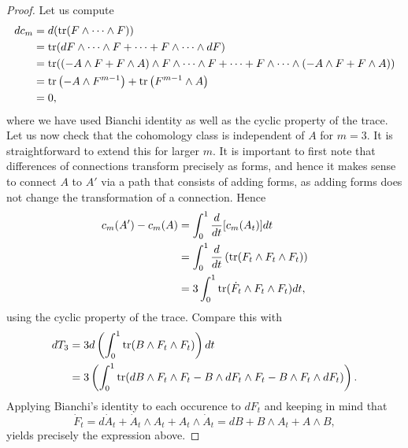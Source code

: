 \documentclass{../mathnotes}
\begin{document}
\begin{proof}
    Let us compute
    \begin{align*}
        dc_m&=d(\operatorname{tr}(F\wedge\cdots\wedge F))\\
        &=\operatorname{tr}(dF\wedge\cdots\wedge F+\cdots+F\wedge\cdots\wedge dF)\\
        &=\operatorname{tr}( (-A\wedge F+F\wedge A)\wedge F\wedge\cdots\wedge F+\cdots+F\wedge\cdots\wedge(-A\wedge F+F\wedge A))\\
        &=\operatorname{tr}\left( -A\wedge F^{m-1} \right)+\operatorname{tr}\left( F^{m-1}\wedge A \right)\\
        &=0,
    \end{align*}
    where we have used Bianchi identity as well as the cyclic property of the trace. Let us now check that the cohomology
    class is independent of $A$ for $m=3$. It is straightforward to extend this for larger $m$. It is important
    to first note that differences of connections transform precisely as forms, and hence it makes sense to
    connect $A$ to $A'$ via a path that consists of adding forms, as adding forms does not change the transformation of a connection.
    Hence
    \begin{align*}
        c_m(A')-c_m(A)&=\int_0^1\frac{d}{dt}[c_m(A_t)]dt\\
        &=\int_0^1\frac{d}{dt}\left( \operatorname{tr}(F_t\wedge F_t\wedge F_t) \right)\\
        &=3\int_0^1\operatorname{tr}(\dot F_t\wedge F_t\wedge F_t) dt,
    \end{align*}
    using the cyclic property of the trace. Compare this with
    \begin{align*}
        dT_3&=3d\left( \int_0^1\operatorname{tr}(B\wedge F_t\wedge F_t) \right)dt\\
        &=3\left( \int_0^1\operatorname{tr}(dB\wedge F_t\wedge F_t-B\wedge dF_t\wedge F_t-B\wedge F_t\wedge dF_t) \right).
    \end{align*}
    Applying Bianchi's identity to each occurence to $dF_t$ and keeping in mind that
    \[\dot F_t=d\dot A_t+\dot A_t\wedge A_t+A_t\wedge \dot A_t=dB+B\wedge A_t+A\wedge B,\]
    yields precisely the expression above.
\end{proof}
\end{document}
